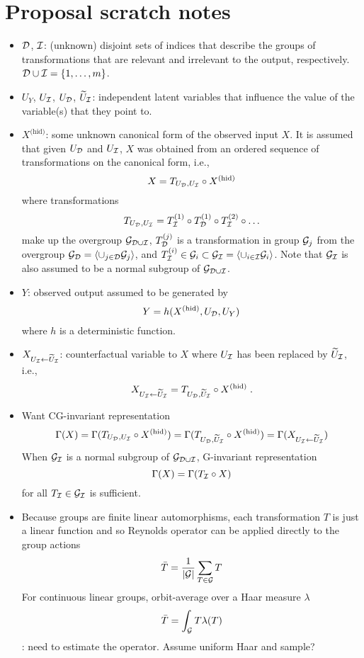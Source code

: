 \documentclass[10pt]{article}
\begin{document}
\section{Proposal scratch notes}

\begin{itemize}

\item
$\mathcal{D}$, $\mathcal{I}$: (unknown) disjoint sets of indices that describe the groups of transformations that are relevant and irrelevant to the output, respectively. $\mathcal{D}\cup\mathcal{I}=\{1,\ldots,m\}$.

\item
$U_Y$, $U_{\mathcal{I}}$, $U_{\mathcal{D}}$, $\widetilde{U}_{\mathcal{I}}$: independent latent variables that influence the value of the variable(s) that they point to.

\item
$X^{\text{(hid)}}$: some unknown canonical form of the observed input $X$.  It is assumed that given $U_{\mathcal{D}}$ and $U_{\mathcal{I}}$, $X$ was obtained from an ordered sequence of transformations on the canonical form, i.e.,
\[
X=T_{U_{\mathcal{D}},U_{\mathcal{I}}}\circ X^{\text{(hid)}}
\]
where transformations
\[
T_{U_{\mathcal{D}},U_{\mathcal{I}}}=T_{\mathcal{I}}^{(1)}\circ T_{\mathcal{D}}^{(1)}\circ T_{\mathcal{I}}^{(2)}\circ\ldots
\]
make up the overgroup $\mathcal{G}_{\mathcal{D}\cup\mathcal{I}}$, $T_{\mathcal{D}}^{(j)}$ is a transformation in group $\mathcal{G}_j$ from the overgroup $\mathcal{G}_{\mathcal{D}}=\langle\cup_{j\in\mathcal{D}}\mathcal{G}_j\rangle$, and $T_{\mathcal{I}}^{(i)}\in\mathcal{G}_i\subset\mathcal{G}_{\mathcal{I}}=\langle\cup_{i\in\mathcal{I}}\mathcal{G}_i\rangle$. Note that $\mathcal{G}_{\mathcal{I}}$ is also assumed to be a normal subgroup of $\mathcal{G}_{\mathcal{D}\cup\mathcal{I}}$.

\item
$Y$: observed output assumed to be generated by
\[
Y = h(X^{\text{(hid)}},U_{\mathcal{D}},U_Y)
\]
where $h$ is a deterministic function.

\item
$X_{U_{\mathcal{I}}\leftarrow\widetilde{U}_{\mathcal{I}}}$: counterfactual variable to $X$ where $U_{\mathcal{I}}$ has been replaced by $\widetilde{U}_{\mathcal{I}}$, i.e.,
\[
X_{U_{\mathcal{I}}\leftarrow\widetilde{U}_{\mathcal{I}}} = T_{U_{\mathcal{D}},\widetilde{U}_{\mathcal{I}}}\circ X^{\text{(hid)}} \;.
\]

\item
Want CG-invariant representation
\[
\Gamma(X) = \Gamma(T_{U_{\mathcal{D}},U_{\mathcal{I}}}\circ X^{\text{(hid)}}) = \Gamma(T_{U_{\mathcal{D}},\widetilde{U}_{\mathcal{I}}}\circ X^{\text{(hid)}}) =  \Gamma(X_{U_{\mathcal{I}}\leftarrow\widetilde{U}_{\mathcal{I}}})
\]
When $\mathcal{G}_{\mathcal{I}}$ is a normal subgroup of $\mathcal{G}_{\mathcal{D}\cup\mathcal{I}}$, G-invariant representation
\[
\Gamma(X) = \Gamma(T_{\mathcal{I}}\circ X)
\]
for all $T_{\mathcal{I}}\in\mathcal{G}_{\mathcal{I}}$ is sufficient.

\item
Because groups are finite linear automorphisms, each transformation $T$ is just a linear function and so Reynolds operator can be applied directly to the group actions
\[
\bar{T} = \frac{1}{|\mathcal{G}|}\sum_{T\in\mathcal{G}}T
\]
For continuous linear groups, orbit-average over a Haar measure $\lambda$
\[
\bar{T} = \int_{\mathcal{G}} T\lambda(T)
\]
\todo: need to estimate the operator. Assume uniform Haar and sample?

\end{itemize}
\end{document}
